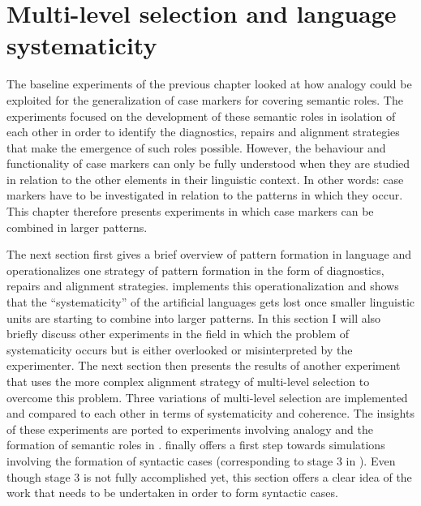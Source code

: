
\setcounter{chapter}{3}
\chapter{Multi-level selection and language systematicity}
\label{c:experiment1}

The baseline experiments of the previous chapter looked at how analogy could be exploited for the generalization of case markers for covering semantic roles. The experiments focused on the development of these semantic roles in isolation of each other in order to identify the diagnostics, repairs and alignment strategies that make the emergence of such roles possible. However, the behaviour and functionality of case markers can only be fully understood when they are studied in relation to the other elements in their linguistic context. In other words: case markers have to be investigated in relation to the patterns in which they occur. This chapter therefore presents experiments in which case markers can be combined in larger patterns.

The next section first gives a brief overview of pattern formation in language and operationalizes one strategy of pattern formation in the form of diagnostics, repairs and alignment strategies.  implements this operationalization and shows that the ``systematicity'' of the artificial languages gets lost once smaller linguistic units are starting to combine into larger patterns. In this section I will also briefly discuss other experiments in the field in which the problem of systematicity occurs but is either overlooked or misinterpreted by the experimenter. The next section then presents the results of another experiment that uses the more complex alignment strategy of multi-level selection to overcome this problem. Three variations of multi-level selection are implemented and compared to each other in terms of systematicity and coherence. The insights of these experiments are ported to experiments involving analogy and the formation of semantic roles in .  finally offers a first step towards simulations involving the formation of syntactic cases (corresponding to stage 3 in ). Even though stage 3 is not fully accomplished yet, this section offers a clear idea of the work that needs to be undertaken in order to form syntactic cases.


